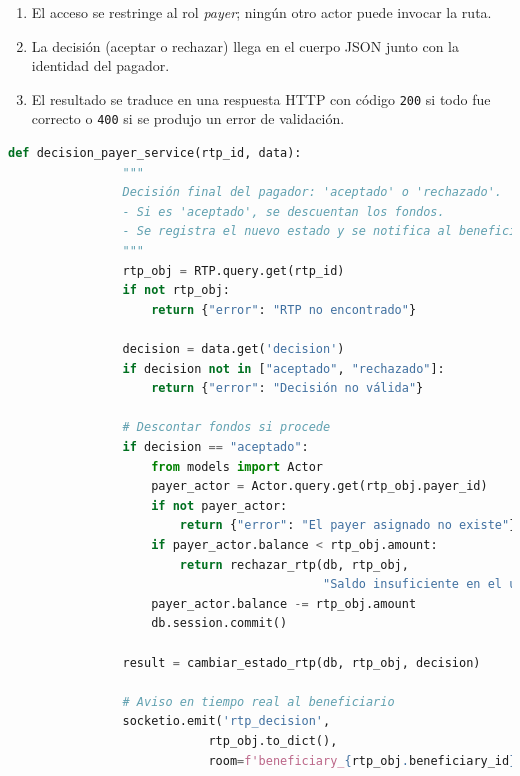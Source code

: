 \begin{itemize}
        \begin{enumerate}
          \item El acceso se restringe al rol \emph{payer}; ningún otro actor
                puede invocar la ruta.  
          \item La decisión (aceptar o rechazar) llega en el cuerpo JSON
                junto con la identidad del pagador.  
          \item El resultado se traduce en una respuesta HTTP con código
                \texttt{200} si todo fue correcto o \texttt{400} si se
                produjo un error de validación.
        \end{enumerate}
        \vspace{0.8em}

       \begin{lstlisting}[language=Python, style=custom]
            def decision_payer_service(rtp_id, data):
                """
                Decisión final del pagador: 'aceptado' o 'rechazado'.
                - Si es 'aceptado', se descuentan los fondos.
                - Se registra el nuevo estado y se notifica al beneficiario.
                """
                rtp_obj = RTP.query.get(rtp_id)
                if not rtp_obj:
                    return {"error": "RTP no encontrado"}
                
                decision = data.get('decision')
                if decision not in ["aceptado", "rechazado"]:
                    return {"error": "Decisión no válida"}

                # Descontar fondos si procede
                if decision == "aceptado":
                    from models import Actor
                    payer_actor = Actor.query.get(rtp_obj.payer_id)
                    if not payer_actor:
                        return {"error": "El payer asignado no existe"}
                    if payer_actor.balance < rtp_obj.amount:
                        return rechazar_rtp(db, rtp_obj,
                                            "Saldo insuficiente en el último momento")
                    payer_actor.balance -= rtp_obj.amount
                    db.session.commit()

                result = cambiar_estado_rtp(db, rtp_obj, decision)

                # Aviso en tiempo real al beneficiario
                socketio.emit('rtp_decision',
                            rtp_obj.to_dict(),
                            room=f'beneficiary_{rtp_obj.beneficiary_id}')


\end{lstlisting}
\end{itemize}
